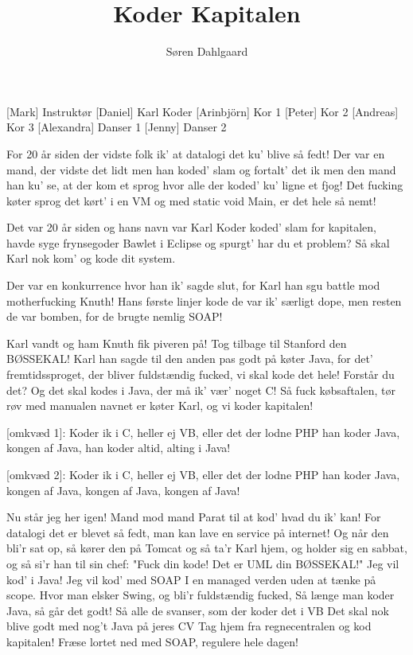 \documentclass[a4paper,11pt]{article}
\title{Koder Kapitalen}
\author{Søren Dahlgaard}
\begin{document}
\maketitle

\begin{roles}
[Mark] Instruktør
[Daniel] Karl Koder
[Arinbjörn] Kor 1
[Peter] Kor 2
[Andreas] Kor 3
[Alexandra] Danser 1
[Jenny] Danser 2
\end{roles}

\begin{song}
     For 20 år siden der vidste folk ik'
at datalogi det ku' blive så fedt!
Der var en mand, der vidste det lidt
men han koded' slam og fortalt' det ik
men den mand han ku' se, at der kom et sprog
hvor alle der koded' ku' ligne et fjog!
Det fucking køter sprog det kørt' i en VM
og med static void Main, er det hele så nemt!

 Det var 20 år siden og hans navn var Karl Koder
koded' slam for kapitalen, havde syge frynsegoder
Bawlet i Eclipse og spurgt' har du et problem?
Så skal Karl nok kom' og kode dit system.

 Der var en konkurrence hvor han ik' sagde slut,
for Karl han sgu battle mod motherfucking Knuth!
Hans første linjer kode de var ik' særligt dope,
men resten de var bomben, for de brugte nemlig SOAP!

 Karl vandt og ham Knuth fik piveren på!
Tog tilbage til Stanford den BØSSEKAL!
Karl han sagde til den anden pas godt på køter Java,
for det' fremtidssproget, der bliver fuldstændig fucked,
vi skal kode det hele! Forstår du det?
Og det skal kodes i Java, der må ik' vær' noget C!
Så fuck købsaftalen, tør røv med manualen
navnet er køter Karl, og vi koder kapitalen!

[omkvæd 1]:
Koder ik i C,
heller ej VB,
eller det der lodne PHP
han koder Java,
kongen af Java,
han koder altid,
alting i Java!

[omkvæd 2]:
Koder ik i C,
heller ej VB,
eller det der lodne PHP
han koder Java,
kongen af Java,
kongen af Java,
kongen af Java!

 Nu står jeg her igen! Mand mod mand
Parat til at kod' hvad du ik' kan!
For datalogi det er blevet så fedt,
man kan lave en service på internet!
Og når den bli'r sat op, så kører den på Tomcat
og så ta'r Karl hjem, og holder sig en sabbat,
og så si'r han til sin chef:
"Fuck din kode! Det er UML din BØSSEKAL!"
Jeg vil kod' i Java! Jeg vil kod' med SOAP
I en managed verden uden at tænke på scope.
Hvor man elsker Swing, og bli'r fuldstændig fucked,
Så længe man koder Java, så går det godt!
Så alle de svanser, som der koder det i VB
Det skal nok blive godt med nog't Java på jeres CV
Tag hjem fra regnecentralen og kod kapitalen!
Fræse lortet ned med SOAP, regulere hele dagen!


\end{song}
\end{document}
